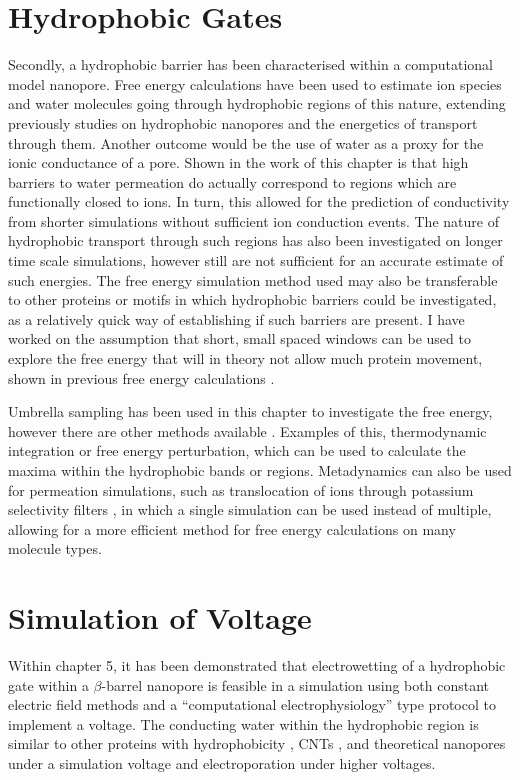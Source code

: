 \section{Hydrophobic Gates}

Secondly, a hydrophobic barrier has been characterised within a computational model nanopore. Free energy calculations have been used to estimate ion species and water molecules going through hydrophobic regions of this nature, extending previously studies on hydrophobic nanopores and the energetics of transport through them. Another outcome would be the use of water as a proxy for the ionic conductance of a pore. Shown in the work of this chapter is that high barriers to water permeation do actually correspond to regions which are functionally closed to ions. In turn, this allowed for the prediction of conductivity from shorter simulations without sufficient ion conduction events. The nature of hydrophobic transport through such regions has also been investigated on longer time scale simulations, however still are not sufficient for an accurate estimate of such energies. The free energy simulation method used may also be transferable to other proteins or motifs in which hydrophobic barriers could be investigated, as a relatively quick way of establishing if such barriers are present. I have worked on the assumption that short, small spaced windows can be used to explore the free energy that will in theory not allow much protein movement, shown in previous free energy calculations \cite{Yoluk2013}.

Umbrella sampling has been used in this chapter to investigate the free energy, however there are other methods available \cite{Domene2009}. Examples of this, thermodynamic integration or free energy perturbation, which can be used to calculate the maxima within the hydrophobic bands or regions. Metadynamics can also be used for permeation simulations, such as translocation of ions through potassium selectivity filters \cite{Domene2008}, in which a single simulation can be used instead of multiple, allowing for a more efficient method for free energy calculations on many molecule types.

\section{Simulation of Voltage}

Within chapter 5, it has been demonstrated that electrowetting of a hydrophobic gate within a $\beta$-barrel nanopore is feasible in a simulation using both constant electric field methods and a ``computational electrophysiology'' type protocol to implement a voltage. The conducting water within the hydrophobic region is similar to other proteins with hydrophobicity \cite{Spronk2006}, CNTs \cite{Vaitheeswaran2004f}, and theoretical nanopores \cite{Dzubiella2003x,Dzubiella2005} under a simulation voltage and electroporation under higher voltages.

